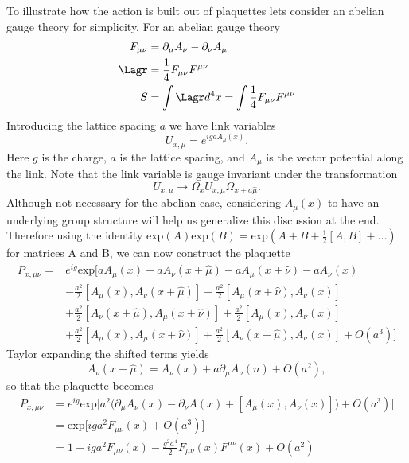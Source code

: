 To illustrate how the action is built out of plaquettes lets consider an abelian gauge theory for simplicity.
For an abelian gauge theory
\begin{align}
  F_{\mu\nu} &= \partial_\mu A_\nu-\partial_\nu A_\mu \\
  \Lagr &= \frac{1}{4}F_{\mu\nu}F^{\mu\nu} \\
  S &= \int \Lagr d^4x = \int  \frac{1}{4}F_{\mu\nu}F^{\mu\nu}
\end{align}
Introducing the lattice spacing $a$ we have link variables
\begin{equation}
  U_{x,\mu}= e^{igaA_\mu(x)}.
\end{equation}
Here $g$ is the charge, $a$ is the lattice spacing, and $A_\mu$ is the vector potential along the link.
Note that the link variable is gauge invariant under the transformation
\begin{equation}
  U_{x,\mu}\rightarrow \Omega_x U_{x,\mu} \Omega_{x+a\hat{\mu}}.
\end{equation}
Although not necessary for the abelian case, considering $A_\mu(x)$ to have an underlying group structure will help us generalize this discussion at the end.
Therefore using the identity $\mbox{exp}(A)\mbox{exp}(B)=\mbox{exp}(A+B+\frac{1}{2}[A,B]+...)$ for matrices A and B, we can now construct the plaquette
\begin{equation}
  \begin{aligned}
    P_{x,\mu\nu}=&e^{ig}\mbox{exp}\Big[aA_\mu(x)+aA_\nu(x+\hat{\mu})-aA_\mu(x+\hat{\nu})-aA_\nu(x) \\
                 &-\frac{a^2}{2}[A_\mu(x),A_\nu(x+\hat{\mu})]-\frac{a^2}{2}[A_\mu(x+\hat{\nu}),A_\nu(x)] \\
                 &+\frac{a^2}{2}[A_\nu(x+\hat{\mu}),A_\mu(x+\hat{\nu})] + \frac{a^2}{2}[A_\mu(x),A_\nu(x)] \\
                 &+\frac{a^2}{2}[A_\mu(x),A_\mu(x+\hat{\nu})]+\frac{a^2}{2}[A_\nu(x+\hat{\mu}),A_\nu(x)]+O(a^3)\Big]
  \end{aligned}
\end{equation}
Taylor expanding the shifted terms yields
\begin{equation}
  A_\nu(x+\hat{\mu})=A_\nu(x)+a\partial_\mu A_\nu(n)+O(a^2),
\end{equation}
so that the plaquette becomes
\begin{equation}
  \begin{aligned}
  P_{x,\mu\nu}&=e^{ig}\mbox{exp}\Big[a^2\big(\partial_\mu A_\nu(x)-\partial_\nu A(x) + [A_\mu(x),A_\nu(x)]\big)+O(a^3)\Big] \\
              &=\mbox{exp}\Big[iga^2F_{\mu\nu}(x)+O(a^3)\Big]  \\
              &=1+iga^2F_{\mu\nu}(x)-\frac{g^2a^4}{2}F_{\mu\nu}(x)F^{\mu\nu}(x) + O(a^2)
  \end{aligned}
\end{equation}
